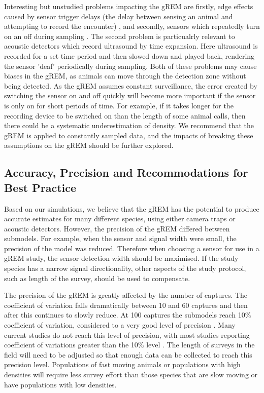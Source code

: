 \documentclass[a4paper,10pt,reqno,oneside]{amsart}
\begin{document}
Interesting but unstudied problems impacting the gREM are firstly, edge effects caused by sensor trigger delays (the delay between sensing an animal and attempting to record the encounter) \citep{rovero2013camera}, and secondly, sensors which repeatedly turn on an off during sampling \citep{jones2011indicator}. The second problem is particualrly relevant to acoustic detectors which record ultrasound by time expansion. Here ultrasound is recorded for a set time period and then slowed down and played back, rendering the sensor 'deaf' periodically during sampling. 
Both of these problems may cause biases in the gREM, as animals can move through the detection zone without being detected. As the gREM assumes constant surveillance, the error created by switching the sensor on and off quickly will become more important if the sensor is only on for short periods of time. For example, if it takes longer for the recording device to be switched on than the length of some animal calls, then there could be a systematic underestimation of density. We recommend that the gREM is applied to constantly sampled data, and the impacts of breaking these assumptions on the gREM should be further explored. 

\subsection*{Accuracy, Precision and Recommodations for Best Practice}
Based on our simulations, we believe that the gREM has the potential to produce accurate estimates for many different species, using either camera traps or acoustic detectors. However, the precision of the gREM differed between submodels. For example, when the sensor and signal width were small, the precision of the model was reduced. Therefore when choosing a sensor for use in a gREM study, the sensor detection width should be maximised. If the study species has a narrow signal directionality, other aspects of the study protocol, such as length of the survey, should be used to compensate. 

The precision of the gREM is greatly affected by the number of captures. The coefficient of variation falls dramatically between 10 and 60 captures and then after this continues to slowly reduce. At 100 captures the submodels reach 10\% coefficient of variation, considered to a very good level of precision \citep{thomas2012passive}. Many current studies do not reach this level of precision, with most studies reporting coefficient of variations greater than the 10\% level \citep{o2003crouching, proctor2010ecological, foster2012critique}. The length of surveys in the field will need to be adjusted so that enough data can be collected to reach this precision level. Populations of fast moving animals or populations with high densities will require less survey effort than those species that are slow moving or have populations with low densities. 
\end{document}
